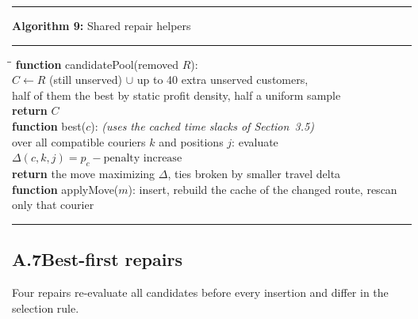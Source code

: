\documentclass[10pt, a4paper]{article}
\begin{document}
\begin{center}
\begin{minipage}{0.92\linewidth}
\small
\hrule\vspace{2pt}
\textbf{Algorithm 9:} Shared repair helpers
\vspace{2pt}\hrule\vspace{4pt}
\begin{tabbing}
\hspace{1.2em}\=\hspace{1.2em}\=\kill
\textbf{function} candidatePool(removed $R$):\\
\>$C \leftarrow R$ (still unserved) $\cup$ up to 40 extra unserved
  customers,\\
\>\quad half of them the best by static profit density, half a uniform
  sample\\
\>\textbf{return} $C$\\[3pt]
\textbf{function} best($c$): \quad\emph{(uses the cached time slacks of
  Section~3.5)}\\
\>over all compatible couriers $k$ and positions $j$: evaluate
  $\Delta(c,k,j) = p_c - \text{penalty increase}$\\
\>\textbf{return} the move maximizing $\Delta$, ties broken by smaller
  travel delta\\[3pt]
\textbf{function} applyMove($m$): insert, rebuild the cache of the changed
route, rescan only that courier
\end{tabbing}
\vspace{2pt}\hrule
\end{minipage}
\end{center}

\subsection*{A.7\quad Best-first repairs}

Four repairs re-evaluate all candidates before every insertion and differ
in the selection rule.
\end{document}
